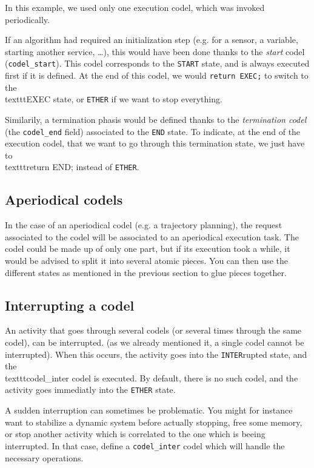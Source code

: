 In this example,   we used only  one execution  codel, which  was invoked
periodically.

If an algorithm had required an  initialization step (e.g.  for a sensor,
a variable, starting another service, \ldots), this  would have been done
thanks to the \emph{start} codel (\texttt{codel\_start}).  This codel
corresponds to the \texttt{START} state, and  is always executed first if it
is  defined. At the  end  of this codel,  we  would \texttt{return EXEC;} to
switch to  the \\texttt{EXEC} state, or   \texttt{ETHER} if   we  want to  stop
everything.

Similarily, a termination phasis   would be defined   thanks to the  {\em
termination codel} (the \texttt{codel\_end} field) associated to the
\texttt{END} state. To indicate, at the end of  the execution codel, that we
want to go through this  termination state, we just  have to \\texttt{return
END;} instead of \texttt{ETHER}.


\subsection{Aperiodical codels}

In  the case of  an aperiodical codel (e.g.   a trajectory planning), the
request associated  to the codel  will be  associated to  an  aperiodical
execution task. The codel  could be made up of  only one part, but if its
execution took  a while,  it  would be advised  to  split it into several
atomic pieces.  You can then use the different states as mentioned in the
previous section to glue pieces together.


\subsection{Interrupting a codel}

An activity that  goes through several  codels (or  several times through
the  same codel), can  be  interrupted.  (as  we already  mentioned it, a
single codel cannot be interrupted). When  this occurs, the activity goes
into the  \texttt{INTER}rupted  state,  and the  \\texttt{codel\_inter}
codel is executed.  By default, there is  no such codel, and the activity
goes immediatly into the \texttt{ETHER} state.

A  sudden  interruption can   sometimes  be problematic.  You  might  for
instance  want  to stabilize a dynamic   system before actually stopping,
free some memory, or stop another activity which is correlated to the one
which   is  beeing     interrupted.  In   that  case,   define    a  
\texttt{codel\_inter} codel which will handle the necessary operations.


